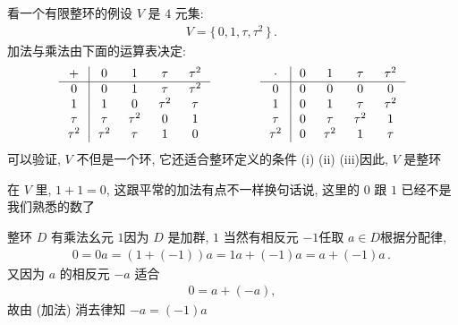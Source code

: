 \begin{example}
    看一个有限整环的例\period 设 $V$  是 $4$ 元集:
    \begin{align*}
        V = \{\, 0,1,\tau,\tau^2 \,\}\period
    \end{align*}
    加法与乘法由下面的运算表决定:
    \begin{align*}
        \arraycolsep=0.25cm
        \begin{array}{c|cccc}
            +      & 0      & 1      & \tau   & \tau^2 \\ \hline
            0      & 0      & 1      & \tau   & \tau^2 \\
            1      & 1      & 0      & \tau^2 & \tau   \\
            \tau   & \tau   & \tau^2 & 0      & 1      \\
            \tau^2 & \tau^2 & \tau   & 1      & 0      \\
        \end{array}
        \qquad \qquad
        \begin{array}{c|cccc}
            \cdot  & 0 & 1      & \tau   & \tau^2 \\ \hline
            0      & 0 & 0      & 0      & 0      \\
            1      & 0 & 1      & \tau   & \tau^2 \\
            \tau   & 0 & \tau   & \tau^2 & 1      \\
            \tau^2 & 0 & \tau^2 & 1      & \tau   \\
        \end{array}
    \end{align*}
    可以验证, $V$ 不但是一个环, 它还适合整环定义的条件 (i) (ii) (iii)\period 因此, $V$ 是整环\period

    在 $V$ 里, $1+1=0$, 这跟平常的加法有点不一样\period 换句话说, 这里的 $0$ 跟 $1$ 已经不是我们熟悉的数了\period
\end{example}

\begin{remark}
    整环 $D$ 有乘法幺元 $1$\period 因为 $D$ 是加群, $1$ 当然有相反元 $-1$\period 任取 $a \in D$\period 根据分配律,
    \begin{align*}
        0 = 0a = (1 + (-1))a = 1a + (-1)a = a + (-1)a \period
    \end{align*}
    又因为 $a$ 的相反元 $-a$ 适合
    \begin{align*}
        0 = a + (-a),
    \end{align*}
    故由 (加法) 消去律知 $-a = (-1)a$\period
\end{remark}

